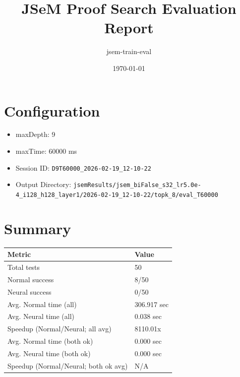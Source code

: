 \documentclass[a4paper,10pt]{article}
\title{JSeM Proof Search Evaluation Report}
\author{jsem-train-eval}
\date{\today}
\begin{document}
\maketitle

\section{Configuration}
\begin{itemize}
\item maxDepth: 9
\item maxTime: 60000 ms
\item Session ID: \texttt{D9T60000\_2026-02-19\_12-10-22}
\item Output Directory: \texttt{jsemResults/jsem\_biFalse\_s32\_lr5.0e-4\_i128\_h128\_layer1/2026-02-19\_12-10-22/topk\_8/eval\_T60000}
\end{itemize}

\section{Summary}
\begin{tabular}{ll}
\toprule
\textbf{Metric} & \textbf{Value} \\
\midrule
Total tests & 50 \\
Normal success & 8/50 \\
Neural success & 0/50 \\
\midrule
Avg. Normal time (all) & 306.917 sec \\
Avg. Neural time (all) & 0.038 sec \\
Speedup (Normal/Neural; all avg) & 8110.01x \\
Avg. Normal time (both ok) & 0.000 sec \\
Avg. Neural time (both ok) & 0.000 sec \\
Speedup (Normal/Neural; both ok avg) & N/A \\
\bottomrule
\end{tabular}
\end{document}
